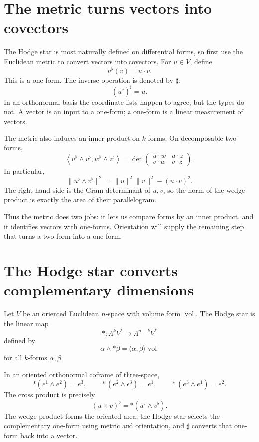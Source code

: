 \section{The metric turns vectors into covectors}

The Hodge star is most naturally defined on differential forms, so first use the Euclidean metric to convert vectors into covectors.  For \(u\in V\), define
\[
  u^{\flat}(v)=u\cdot v.
\]
This is a one-form.  The inverse operation is denoted by \(\sharp\):
\[
  (u^{\flat})^{\sharp}=u.
\]
In an orthonormal basis the coordinate lists happen to agree, but the types do not.  A vector is an input to a one-form; a one-form is a linear measurement of vectors.

The metric also induces an inner product on \(k\)-forms.  On decomposable two-forms,
\[
  \left\langle
  u^{\flat}\wedge v^{\flat},
  w^{\flat}\wedge z^{\flat}
  \right\rangle
  =
  \det
  \begin{pmatrix}
    u\cdot w&u\cdot z\\
    v\cdot w&v\cdot z
  \end{pmatrix}.
\]
In particular,
\[
  \|u^{\flat}\wedge v^{\flat}\|^2
  =\|u\|^2\|v\|^2-(u\cdot v)^2.
\]
The right-hand side is the Gram determinant of \(u,v\), so the norm of the wedge product is exactly the area of their parallelogram.

Thus the metric does two jobs: it lets us compare forms by an inner product, and it identifies vectors with one-forms.  Orientation will supply the remaining step that turns a two-form into a one-form.

\section{The Hodge star converts complementary dimensions}

Let \(V\) be an oriented Euclidean \(n\)-space with volume form \(\operatorname{vol}\).  The Hodge star is the linear map
\[
  *:\Lambda^kV^*\to\Lambda^{n-k}V^*
\]
defined by
\[
  \alpha\wedge *\beta
  =\langle\alpha,\beta\rangle\operatorname{vol}
\]
for all \(k\)-forms \(\alpha,\beta\).

In an oriented orthonormal coframe of three-space,
\[
  *(e^1\wedge e^2)=e^3,
  \qquad
  *(e^2\wedge e^3)=e^1,
  \qquad
  *(e^3\wedge e^1)=e^2.
\]
The cross product is precisely
\[
  \boxed{
  (u\times v)^{\flat}
  =*(u^{\flat}\wedge v^{\flat}).}
\]
The wedge product forms the oriented area, the Hodge star selects the complementary one-form using metric and orientation, and \(\sharp\) converts that one-form back into a vector.

